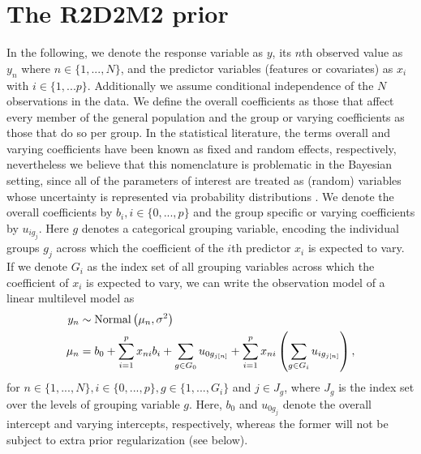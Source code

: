 \section{The R2D2M2 prior}

\label{sec:r2d2m2prior}

In the following, we denote the response variable as $y$, its $n$th observed value as $y_n$ where $n \in \{1,...,N\}$, and the predictor variables (features or covariates) as $x_i$ with $i \in \{1,...p\}$. Additionally we assume conditional independence of the $N$ observations in the data. We define the overall coefficients as those that affect every member of the general population and the group or varying coefficients as those that do so per group.  In the statistical literature, the terms overall and varying coefficients have been known as fixed and random effects, respectively, nevertheless we believe that this nomenclature is problematic in the Bayesian setting, since all of the parameters of interest are treated as (random) variables whose uncertainty is represented via probability distributions \citep{gelman_hill_2006}. We denote the overall coefficients by $b_i,  i \in \{0,...,p\}$ and the group specific or varying coefficients by $u_{i g_j}$. Here $g$ denotes a categorical grouping variable, encoding the individual groups $g_j$ across which the coefficient of the $i$th predictor $x_i$ is expected to vary. If we denote $G_i$ as the index set of all grouping variables across which the coefficient of $x_i$ is expected to vary, we can write the observation model of a linear multilevel model as
\begin{align}
\label{eq:lklhd}
    y_n &\sim \text{Normal} \left( \mu_n, \sigma^2 \right) \\
    \mu_n &= b_{0}+ \sum_{i=1}^p x_{ni} b_{i}+  \sum_{g\in G_0} u_{0 g_{j[n]}  }  + \sum_{i=1}^p x_{ni} \left( \sum_{g \in G_i} u_{i g_{j[n]}} \right),
\end{align}
for $n \in \{1,...,N\}, i \in \{0,...,p\},g\in \{1,..., G_i\} $ and $j\in J_g$, where $J_g$ is the index set over the levels of grouping variable $g$. Here, $b_0$ and $u_{0 g_j}$ denote the overall intercept and varying intercepts, respectively, whereas the former will not be subject to extra prior regularization (see below). \\

